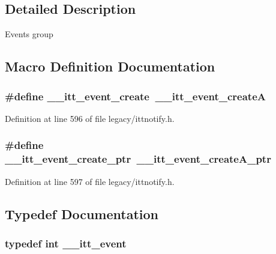 \subsection{Detailed Description}
Events group 

\subsection{Macro Definition Documentation}
\hypertarget{group__legacy__events_ga6047262ecd47411ed590bd073f9e4da0}{
\subsubsection[{\-\_\-\-\_\-itt\-\_\-event\-\_\-create}]{\setlength{\rightskip}{0pt plus 5cm}\#define \-\_\-\-\_\-itt\-\_\-event\-\_\-create~{\bf \-\_\-\-\_\-itt\-\_\-event\-\_\-create\-A}}}\label{group__legacy__events_ga6047262ecd47411ed590bd073f9e4da0}


Definition at line 596 of file legacy/ittnotify.\-h.

\hypertarget{group__legacy__events_ga89cc719b31bd37bcb563754a9c9e7f8d}{
\subsubsection[{\-\_\-\-\_\-itt\-\_\-event\-\_\-create\-\_\-ptr}]{\setlength{\rightskip}{0pt plus 5cm}\#define \-\_\-\-\_\-itt\-\_\-event\-\_\-create\-\_\-ptr~\-\_\-\-\_\-itt\-\_\-event\-\_\-create\-A\-\_\-ptr}}\label{group__legacy__events_ga89cc719b31bd37bcb563754a9c9e7f8d}


Definition at line 597 of file legacy/ittnotify.\-h.



\subsection{Typedef Documentation}
\hypertarget{group__legacy__events_gaf3abb988e507916595fa4a13f5a524e4}{
\subsubsection[{\-\_\-\-\_\-itt\-\_\-event}]{\setlength{\rightskip}{0pt plus 5cm}typedef {\bf int} {\bf \-\_\-\-\_\-itt\-\_\-event}}}\label{group__legacy__events_gaf3abb988e507916595fa4a13f5a524e4}


